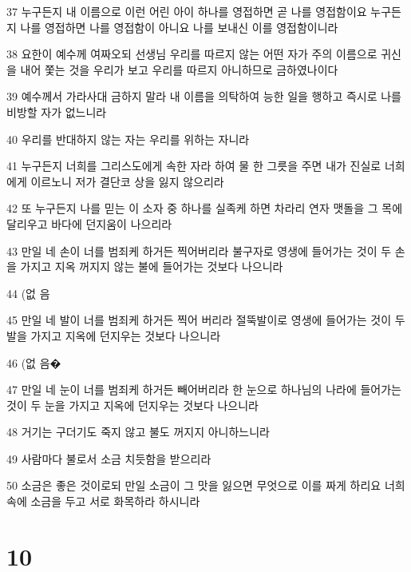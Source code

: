 \par 37 누구든지 내 이름으로 이런 어린 아이 하나를 영접하면 곧 나를 영접함이요 누구든지 나를 영접하면 나를 영접함이 아니요 나를 보내신 이를 영접함이니라
\par 38 요한이 예수께 여짜오되 선생님 우리를 따르지 않는 어떤 자가 주의 이름으로 귀신을 내어 쫓는 것을 우리가 보고 우리를 따르지 아니하므로 금하였나이다
\par 39 예수께서 가라사대 금하지 말라 내 이름을 의탁하여 능한 일을 행하고 즉시로 나를 비방할 자가 없느니라
\par 40 우리를 반대하지 않는 자는 우리를 위하는 자니라
\par 41 누구든지 너희를 그리스도에게 속한 자라 하여 물 한 그릇을 주면 내가 진실로 너희에게 이르노니 저가 결단코 상을 잃지 않으리라
\par 42 또 누구든지 나를 믿는 이 소자 중 하나를 실족케 하면 차라리 연자 맷돌을 그 목에 달리우고 바다에 던지움이 나으리라
\par 43 만일 네 손이 너를 범죄케 하거든 찍어버리라 불구자로 영생에 들어가는 것이 두 손을 가지고 지옥 꺼지지 않는 불에 들어가는 것보다 나으니라
\par 44 (없 음
\par 45 만일 네 발이 너를 범죄케 하거든 찍어 버리라 절뚝발이로 영생에 들어가는 것이 두 발을 가지고 지옥에 던지우는 것보다 나으니라
\par 46 (없 음�
\par 47 만일 네 눈이 너를 범죄케 하거든 빼어버리라 한 눈으로 하나님의 나라에 들어가는 것이 두 눈을 가지고 지옥에 던지우는 것보다 나으니라
\par 48 거기는 구더기도 죽지 않고 불도 꺼지지 아니하느니라
\par 49 사람마다 불로서 소금 치듯함을 받으리라
\par 50 소금은 좋은 것이로되 만일 소금이 그 맛을 잃으면 무엇으로 이를 짜게 하리요 너희 속에 소금을 두고 서로 화목하라 하시니라

\chapter{10}

